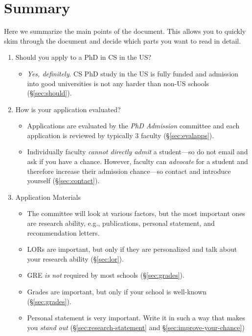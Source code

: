 \documentclass[11pt]{article}
\begin{document}
\tableofcontents


\section{Summary}\label{sec:summary}



Here we summarize the main points of the document. This allows you to quickly skim through the document and decide which parts you want to read in detail.
\begin{enumerate}
\item Should you apply to a PhD in CS in the US?
\begin{itemize}
    \item \emph{Yes, definitely}.  CS PhD study in the US is fully funded and admission into good universities is not any harder than non-US schools (\S\ref{sec:should}).
\end{itemize}
\item How is your application evaluated?
\begin{itemize}
    \item Applications are evaluated by the \emph{PhD Admission} committee and each application is reviewed by typically 3 faculty (\S\ref{sec:evalapps}).
    \item Individually faculty \emph{cannot directly admit} a student---so do not email and ask if you have a chance. However, faculty can \emph{advocate} for a student and therefore increase their admission chance---so contact and introduce yourself (\S\ref{sec:contact}).
\end{itemize}
\item Application Materials
\begin{itemize}
    \item The committee will look at various factors, but the most important ones are research ability, e.g., publications, personal statement, and recommendation letters.
    \item LORs are important, but only if they are personalized and talk about your research ability (\S\ref{sec:lor}).
    \item GRE \emph{is not} required by most schools (\S\ref{sec:grades}).
    \item Grades are important, but only if your school is well-known (\S\ref{sec:grades}).
    \item Personal statement is very important. Write it in such a way that makes you \emph{stand out} (\S\ref{sec:research-statement} and \S\ref{sec:improve-your-chance})

\end{itemize}
\end{enumerate}
\end{document}
